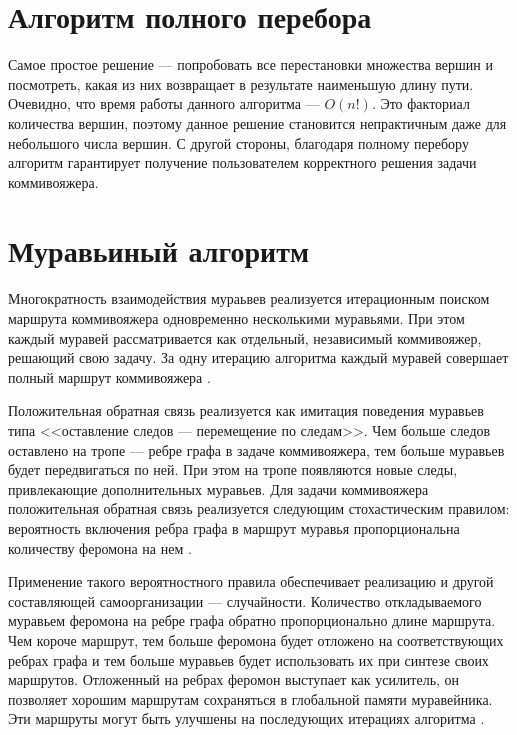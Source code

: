 \section{Алгоритм полного перебора}

Самое простое решение --- попробовать все перестановки множества вершин и посмотреть, какая из них возвращает в результате наименьшую длину пути. 
Очевидно, что время работы данного алгоритма --- $O(n!)$. 
Это факториал количества вершин, поэтому данное решение становится непрактичным даже для небольшого числа вершин. 
С другой стороны, благодаря полному перебору алгоритм гарантирует получение пользователем корректного решения задачи коммивояжера.

\section{Муравьиный алгоритм}

Многократность взаимодействия мураьвев реализуется итерационным поиском маршрута коммивояжера одновременно несколькими муравьями. 
При этом каждый муравей рассматривается как отдельный, независимый коммивояжер, решающий свою задачу. 
За одну итерацию алгоритма каждый муравей совершает полный маршрут коммивояжера \cite{Shtovba2003}.

Положительная обратная связь реализуется как имитация поведения муравьев типа <<оставление следов --- перемещение по следам>>. 
Чем больше следов оставлено на тропе --- ребре графа в задаче коммивояжера, тем больше муравьев будет
передвигаться по ней. 
При этом на тропе появляются новые следы, привлекающие дополнительных муравьев. 
Для задачи коммивояжера положительная обратная связь реализуется следующим стохастическим правилом: вероятность включения ребра графа в маршрут муравья пропорциональна количеству феромона на нем \cite{Shtovba2003}.

Применение такого вероятностного правила обеспечивает реализацию и другой составляющей самоорганизации --- случайности. 
Количество откладываемого муравьем феромона на ребре графа обратно пропорционально длине маршрута. 
Чем короче маршрут, тем больше феромона будет отложено на соответствующих ребрах графа и тем больше муравьев будет использовать их при синтезе своих маршрутов. 
Отложенный на ребрах феромон выступает как усилитель, он позволяет хорошим маршрутам сохраняться в глобальной памяти муравейника. 
Эти маршруты могут быть улучшены на последующих итерациях алгоритма \cite{Shtovba2003}.

